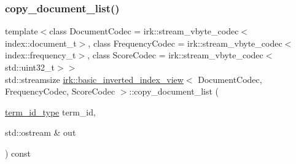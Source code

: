 \mbox{\label{classirk_1_1basic__inverted__index__view_a31a82a662afae22750e62bda04f8301f}} 
\subsubsection{\texorpdfstring{copy\+\_\+document\+\_\+list()}{copy\_document\_list()}}
{\footnotesize\ttfamily template$<$class Document\+Codec  = irk\+::stream\+\_\+vbyte\+\_\+codec$<$index\+::document\+\_\+t$>$, class Frequency\+Codec  = irk\+::stream\+\_\+vbyte\+\_\+codec$<$index\+::frequency\+\_\+t$>$, class Score\+Codec  = irk\+::stream\+\_\+vbyte\+\_\+codec$<$std\+::uint32\+\_\+t$>$$>$ \\
std\+::streamsize \mbox{\hyperlink{classirk_1_1basic__inverted__index__view}{irk\+::basic\+\_\+inverted\+\_\+index\+\_\+view}}$<$ Document\+Codec, Frequency\+Codec, Score\+Codec $>$\+::copy\+\_\+document\+\_\+list (\begin{DoxyParamCaption}\item[{\mbox{\hyperlink{classirk_1_1basic__inverted__index__view_a6b272abc76df208ce59bac93810e7331}{term\+\_\+id\+\_\+type}}}]{term\+\_\+id,  }\item[{std\+::ostream \&}]{out }\end{DoxyParamCaption}) const\hspace{0.3cm}{\ttfamily [inline]}}

\mbox{\label{classirk_1_1basic__inverted__index__view_a7f5eae6697a96cc81e74e620b9447884}} 
